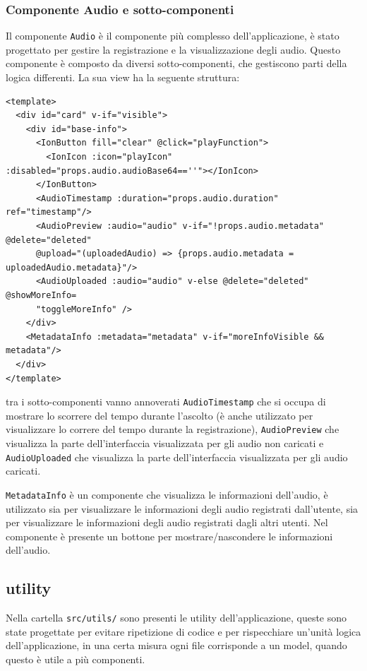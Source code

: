 \documentclass{article}
\begin{document}
\subsubsection{Componente Audio e sotto-componenti}
Il componente \texttt{Audio} è il componente più complesso dell'applicazione, è stato progettato per gestire la registrazione e la visualizzazione degli audio. Questo componente è composto da diversi sotto-componenti, che gestiscono parti della logica differenti. La sua view ha la seguente struttura:
\begin{verbatim}
<template>
  <div id="card" v-if="visible">
    <div id="base-info">
      <IonButton fill="clear" @click="playFunction">
        <IonIcon :icon="playIcon" :disabled="props.audio.audioBase64==''"></IonIcon>
      </IonButton>
      <AudioTimestamp :duration="props.audio.duration" ref="timestamp"/>
      <AudioPreview :audio="audio" v-if="!props.audio.metadata" @delete="deleted" 
      @upload="(uploadedAudio) => {props.audio.metadata = uploadedAudio.metadata}"/>
      <AudioUploaded :audio="audio" v-else @delete="deleted" @showMoreInfo=
      "toggleMoreInfo" />
    </div>
    <MetadataInfo :metadata="metadata" v-if="moreInfoVisible && metadata"/>
  </div>
</template>
\end{verbatim}

tra i sotto-componenti vanno annoverati \texttt{AudioTimestamp} che si occupa di mostrare lo scorrere del tempo durante l'ascolto (è anche utilizzato per visualizzare lo correre del tempo durante la registrazione), \texttt{AudioPreview} che visualizza la parte dell'interfaccia visualizzata per gli audio non caricati e \texttt{AudioUploaded} che visualizza la parte dell'interfaccia visualizzata per gli audio caricati.

\texttt{MetadataInfo} è un componente che visualizza le informazioni dell'audio, è utilizzato sia per visualizzare le informazioni degli audio registrati dall'utente, sia per visualizzare le informazioni degli audio registrati dagli altri utenti. Nel componente è presente un bottone per mostrare/nascondere le informazioni dell'audio.



\subsection{utility}
Nella cartella \texttt{src/utils/} sono presenti le utility dell'applicazione, queste sono state progettate per evitare ripetizione di codice e per rispecchiare un'unità logica dell'applicazione, in una certa misura ogni file corrisponde a un model, quando questo è utile a più componenti.
\end{document}
